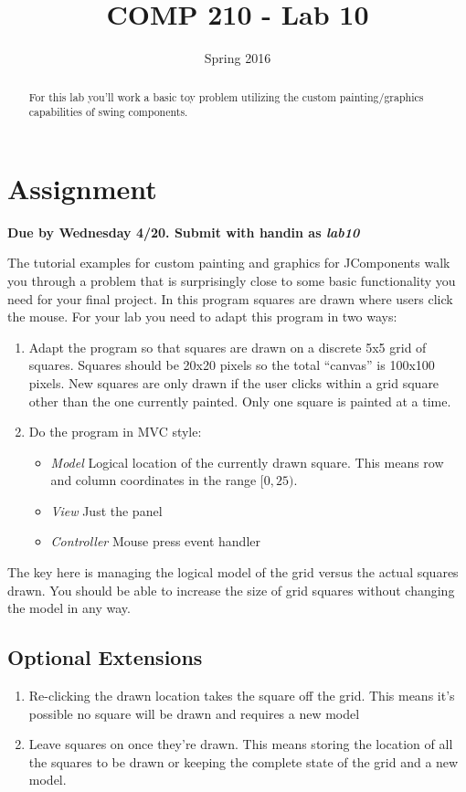 \documentclass[nobib]{tufte-handout}
\title{COMP 210 - Lab 10}
\date{Spring 2016}
\begin{document}
 
\maketitle

\begin{abstract}
For this lab you'll work a basic toy problem utilizing the custom painting/graphics capabilities of swing components.
\end{abstract}

\section{Assignment}

\begin{center}
\textbf{Due by Wednesday 4/20. Submit with handin as \textit{lab10}}
\end{center}

The tutorial examples for custom painting and graphics for JComponents walk you through a problem that is surprisingly close to some basic functionality you need for your final project. In this program squares are drawn where users click the mouse. For your lab you need to adapt this program in two ways:
\begin{enumerate}
\item Adapt the program so that squares are drawn on a discrete 5x5 grid of squares. Squares should be 20x20 pixels so the total ``canvas'' is 100x100 pixels. New squares are only drawn if the user clicks within a grid square other than the one currently painted. Only one square is painted at a time. 
\item Do the program in MVC style:
\begin{itemize}
\item \textit{Model} Logical location of the currently drawn square. This means row and column coordinates in the range $[0,25)$. 
\item \textit{View} Just the panel
\item \textit{Controller} Mouse press event handler
\end{itemize}
\end{enumerate}
The key here is managing the logical model of the grid versus the actual squares drawn.  You should be able to increase the size of grid squares without changing the model in any way. 

\subsection{Optional Extensions}

\begin{enumerate}
\item Re-clicking the drawn location takes the square off the grid. This means it's possible no square will be drawn and requires a new model
\item Leave squares on once they're drawn.  This means storing the location of all the squares to be drawn or keeping the complete state of the grid and a new model.
\end{enumerate}
\end{document}
